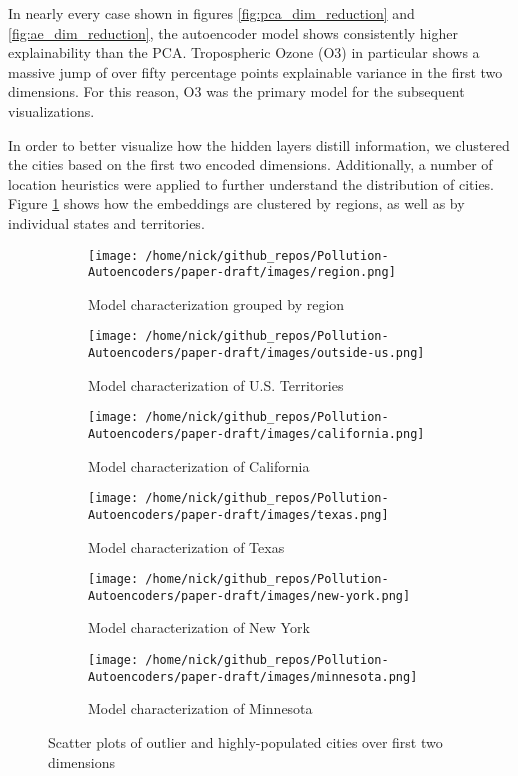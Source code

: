 \documentclass{article}
\begin{document}
\par In nearly every case shown in figures \ref{fig:pca_dim_reduction} and \ref{fig:ae_dim_reduction}, the autoencoder model shows consistently higher explainability than the PCA. Tropospheric Ozone (O3) in particular shows a massive jump of over fifty percentage points explainable variance in the first two dimensions. For this reason, O3 was the primary model for the subsequent visualizations.
\par In order to better visualize how the hidden layers distill information, we clustered the cities based on the first two encoded dimensions. Additionally, a number of location heuristics were applied to further understand the distribution of cities. Figure \ref{fig:heuristic_labels} shows how the embeddings are clustered by regions, as well as by individual states and territories.

\begin{figure}[h!]
\begin{subfigure}{0.5\textwidth}
    \texttt{[image: /home/nick/github\_repos/Pollution-Autoencoders/paper-draft/images/region.png]} 
    \caption{Model characterization grouped by region}
\end{subfigure}
\begin{subfigure}{0.5\textwidth}
    \texttt{[image: /home/nick/github\_repos/Pollution-Autoencoders/paper-draft/images/outside-us.png]}
    \caption{Model characterization of U.S. Territories}
\end{subfigure}
\begin{subfigure}{0.5\textwidth}
    \texttt{[image: /home/nick/github\_repos/Pollution-Autoencoders/paper-draft/images/california.png]} 
    \caption{Model characterization of California}
\end{subfigure}
\begin{subfigure}{0.5\textwidth}
    \texttt{[image: /home/nick/github\_repos/Pollution-Autoencoders/paper-draft/images/texas.png]} 
    \caption{Model characterization of Texas}
\end{subfigure}
\begin{subfigure}{0.5\textwidth}
    \texttt{[image: /home/nick/github\_repos/Pollution-Autoencoders/paper-draft/images/new-york.png]}
    \caption{Model characterization of New York}
\end{subfigure}
\begin{subfigure}{0.5\textwidth}
    \texttt{[image: /home/nick/github\_repos/Pollution-Autoencoders/paper-draft/images/minnesota.png]}
    \caption{Model characterization of Minnesota}
\end{subfigure}
\caption{Scatter plots of outlier and highly-populated cities over first two dimensions}
\label{fig:heuristic_labels}
\end{figure}
\end{document}
